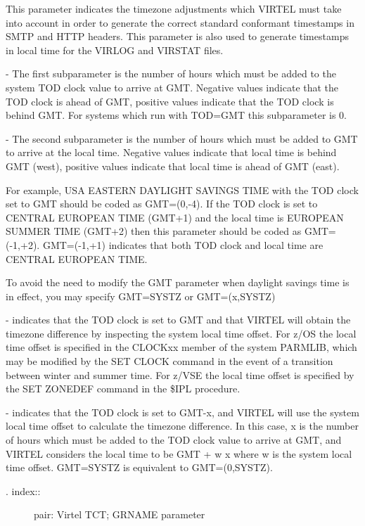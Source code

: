\documentclass[letterpaper,10pt,english]{sphinxmanual}
\begin{document}
This parameter indicates the timezone adjustments which VIRTEL must take into account in order to generate the correct standard conformant timestamps in SMTP and HTTP headers. This parameter is also used to generate
timestamps in local time for the VIRLOG and VIRSTAT files.

 - The first subparameter is the number of hours which must be added to the system TOD clock value to arrive at GMT. Negative values indicate that the TOD clock is ahead of GMT, positive values indicate that the TOD clock is behind GMT. For systems which run with TOD=GMT this subparameter is 0.

 - The second subparameter is the number of hours which must be added to GMT to arrive at the local time. Negative values indicate that local time is behind GMT (west), positive values indicate that local time is ahead of GMT (east).

For example, USA EASTERN DAYLIGHT SAVINGS TIME with the TOD clock set to GMT should be coded as GMT=(0,-4). If the TOD clock is set to CENTRAL EUROPEAN TIME (GMT+1) and the local time is EUROPEAN SUMMER TIME (GMT+2) then this parameter should be coded as GMT=(-1,+2). GMT=(-1,+1) indicates that both TOD clock and local time are CENTRAL EUROPEAN TIME.

To avoid the need to modify the GMT parameter when daylight savings time is in effect, you may specify GMT=SYSTZ or GMT=(x,SYSTZ)

 - indicates that the TOD clock is set to GMT and that VIRTEL will obtain the timezone difference by inspecting the system local time offset. For z/OS the local time offset is specified in the CLOCKxx member of the system PARMLIB, which may be modified by the SET CLOCK command in the event of a transition between winter and summer time. For z/VSE the local time offset is specified by the SET ZONEDEF command in the \$IPL procedure.

 - indicates that the TOD clock is set to GMT-x, and VIRTEL will use the system local time offset to calculate the timezone difference. In this case, x is the number of hours which must be added to the TOD clock value to arrive at GMT, and VIRTEL considers the local time to be GMT + w \textendash{} x where w is the system local time offset. GMT=SYSTZ is equivalent to GMT=(0,SYSTZ).
\begin{description}
\item[{. index::}] \leavevmode
pair: Virtel TCT; GRNAME parameter

\end{description}
\end{document}
